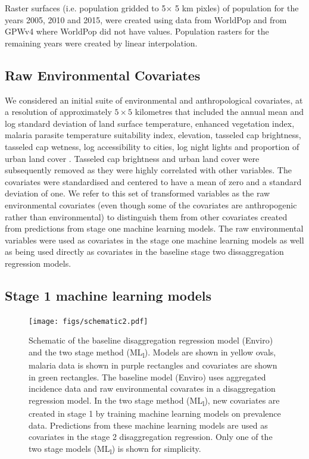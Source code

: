\documentclass[review]{elsarticle}
\begin{document}
Raster surfaces (i.e. population gridded to 5$ \times$ 5 km pixles) of population for the years 2005, 2010 and 2015, were created using data from WorldPop \citep{linard2012population,gaughan2013high,  sorichetta2015high} and from GPWv4 \citep{gpw4} where WorldPop did not have values. 
Population rasters for the remaining years were created by linear interpolation. 

\subsection{Raw Environmental Covariates}

We considered an initial suite of environmental and anthropological covariates, at a resolution of approximately $5 \times 5$ kilometres that included the annual mean and log standard deviation of land surface temperature, enhanced vegetation index, malaria parasite temperature suitability index, elevation, tasseled cap brightness, tasseled cap wetness, log accessibility to cities, log night lights and proportion of urban land cover \citep{weiss2014air, weiss2015re, weiss2018global}. 
Tasseled cap brightness and urban land cover were subsequently removed as they were highly correlated with other variables. 
The covariates were standardised and centered to have a mean of zero and a standard deviation of one. 
We refer to this set of transformed variables as the raw environmental covariates (even though some of the covariates are anthropogenic rather than environmental) to distinguish them from other covariates created from predictions from stage one machine learning models.
The raw environmental variables were used as covariates in the stage one machine learning models as well as being used directly as covariates in the baseline stage two dissaggregation regression models.



\subsection{Stage 1 machine learning models}


\begin{figure}[t!]
  \centering
  \texttt{[image: figs/schematic2.pdf]}
\caption{
  Schematic of the baseline disaggregation regression model (Enviro) and the two stage method (ML\textsubscript{l}). 
  Models are shown in yellow ovals, malaria data is shown in purple rectangles and covariates are shown in green rectangles.
  The baseline model (Enviro) uses aggregated incidence data and raw environmental covarates in a disaggregation regression model.
  In the two stage method (ML\textsubscript{l}), new covariates are created in stage 1 by training machine learning models on prevalence data.
  Predictions from these machine learning models are used as covariates in the stage 2 disaggregation regression.
  Only one of the two stage models (ML\textsubscript{l}) is shown for simplicity.
}
\label{f:schem}
\end{figure}
\end{document}
